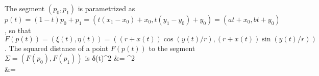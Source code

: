 \documentclass{article}
\newenvironment{eqsplit}{\equation\aligned}{\endaligned\endequation}
\begin{document}
The segment $(p_0, p_1)$ is parametrized as
$p(t) = (1-t) p_0 + p_1
 = (t(x_1-x_0) + x_0, t (y_1 - y_0) + y_0)
 = (a t + x_0, b t + y_0)$,
so that
$F(p(t)) = (ξ(t), η(t)) = ((r+x(t)) \cos(y(t)/r), (r+x(t)) \sin(y(t)/r))$.
The squared distance of a point $F(p(t))$ to the
segment~$Σ=(F(p_0),F(p_1))$
is
\begin{eqsplit}
δ(t)^2
&=  ^2\\
&= \\
\end{eqsplit}
\end{document}
